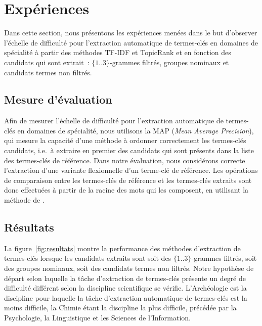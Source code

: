 \section{Expériences}
\label{sec:experiences}
  Dans cette section, nous présentons les expériences menées dans le but
  d'observer l'échelle de difficulté pour l'extraction automatique de
  termes-clés en domaines de spécialité à partir des méthodes TF-IDF et
  TopicRank et en fonction des candidats qui sont extrait~: $\{1..3\}$-grammes
  filtrés, groupes nominaux et candidats termes non filtrés.

  \subsection{Mesure d'évaluation}
  \label{subsec:mesure_d_evaluation}
    Afin de mesurer l'échelle de difficulté pour l'extraction automatique de
    termes-clés en domaines de spécialité, nous utilisons la MAP (\textit{Mean
    Average Precision}), qui mesure la capacité d'une méthode à ordonner
    correctement les termes-clés candidats, i.e.~à extraire en premier des
    candidats qui sont présents dans la liste des termes-clés de référence. Dans
    notre évaluation, nous considérons correcte l'extraction d'une variante
    flexionnelle d'un terme-clé de référence. Les opérations de comparaison
    entre les termes-clés de référence et les termes-clés extraits sont donc
    effectuées à partir de la racine des mots qui les composent, en utilisant la
    méthode de .

  \subsection{Résultats}
  \label{subsec:resultats}
    La figure~\ref{fig:resultats} montre la performance des méthodes
    d'extraction de termes-clés lorsque les candidats extraits sont soit des
    $\{1..3\}$-grammes filtrés, soit des groupes nominaux, soit des candidats
    termes non filtrés.
    Notre hypothèse de départ selon laquelle la tâche d'extraction de
    termes-clés présente un degré de difficulté différent selon la discipline
    scientifique se vérifie.
    L'Archéologie
    est la discipline pour laquelle la tâche d'extraction automatique de
    termes-clés est la moins difficile, la Chimie étant la discipline la plus
    difficile, précédée par la Psychologie, la Linguistique et les Sciences de
    l'Information.

